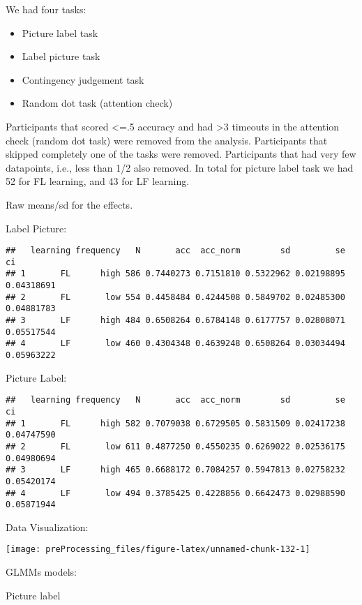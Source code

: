 \documentclass[
]{article}
\begin{document}
We had four tasks:

\begin{itemize}
\item
  Picture label task
\item
  Label picture task
\item
  Contingency judgement task
\item
  Random dot task (attention check)
\end{itemize}

Participants that scored \textless=.5 accuracy and had \textgreater3
timeouts in the attention check (random dot task) were removed from the
analysis. Participants that skipped completely one of the tasks were
removed. Participants that had very few datapoints, i.e., less than 1/2
also removed. In total for picture label task we had 52 for FL learning,
and 43 for LF learning.

Raw means/sd for the effects.

Label Picture:

\begin{verbatim}
##   learning frequency   N       acc  acc_norm        sd         se         ci
## 1       FL      high 586 0.7440273 0.7151810 0.5322962 0.02198895 0.04318691
## 2       FL       low 554 0.4458484 0.4244508 0.5849702 0.02485300 0.04881783
## 3       LF      high 484 0.6508264 0.6784148 0.6177757 0.02808071 0.05517544
## 4       LF       low 460 0.4304348 0.4639248 0.6508264 0.03034494 0.05963222
\end{verbatim}

Picture Label:

\begin{verbatim}
##   learning frequency   N       acc  acc_norm        sd         se         ci
## 1       FL      high 582 0.7079038 0.6729505 0.5831509 0.02417238 0.04747590
## 2       FL       low 611 0.4877250 0.4550235 0.6269022 0.02536175 0.04980694
## 3       LF      high 465 0.6688172 0.7084257 0.5947813 0.02758232 0.05420174
## 4       LF       low 494 0.3785425 0.4228856 0.6642473 0.02988590 0.05871944
\end{verbatim}

Data Visualization:

\begin{center}\texttt{[image: preProcessing\_files/figure-latex/unnamed-chunk-132-1]} \end{center}

GLMMs models:

Picture label
\end{document}
